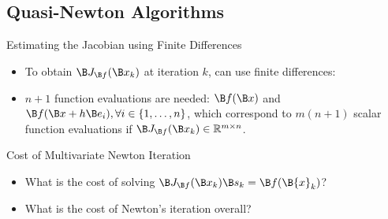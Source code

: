 \subsection{Quasi-Newton Algorithms}

\begin{frame}{Estimating the Jacobian using Finite Differences}

\begin{itemize}
\item To obtain $\B J_{\B f}(\B x_k)$ at iteration $k$, can use finite differences:


\item $n+1$ function evaluations are needed: $\B f(\B x)$ and $\B f(\B x+h\B e_i), \forall i\in\{1,\ldots,n\}$, which correspond to $m(n+1)$ scalar function evaluations if $\B J_{\B f}(\B x_k)\in\mathbb{R}^{m\times n}$.
\lgcond{}

\end{itemize}

\end{frame}


\begin{frame}{Cost of Multivariate Newton Iteration}

\begin{itemize}

\item What is the cost of solving $\B J_{\B f}(\B x_k)\B s_{k} = \B f (\B{x}_k)$?


\item What is the cost of Newton's iteration overall?

\end{itemize}

\end{frame}


